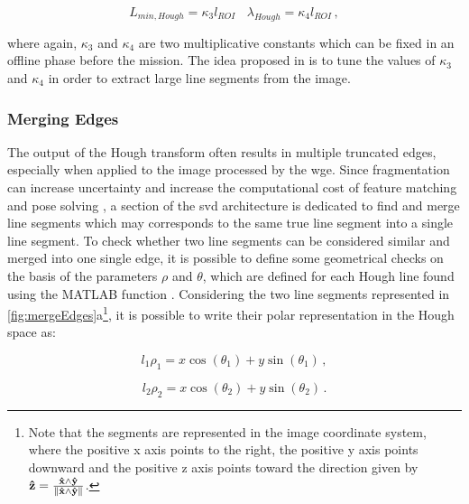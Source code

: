 \begin{equation*}
L_{min,Hough} = \kappa_3 l_{ROI} \ \ \ \  \lambda_{Hough} = \kappa_4 l_{ROI}  \,,
\end{equation*}

where again, $\kappa_3$ and $\kappa_4$  are two multiplicative constants which can be fixed in an offline phase before the mission. The idea proposed in \cite{Sharma2018} is to tune the values of $\kappa_3$ and $\kappa_4$ in order to extract large line segments from the image.

\subsubsection{Merging Edges}\label{sec:mergingedges}
The output of the Hough transform often results in multiple truncated edges, especially when applied to the image processed by the \acrshort{wge}. Since fragmentation can increase uncertainty and increase the computational cost of feature matching and pose solving \cite{fracchio2019}, a section of the \acrshort{svd} architecture is dedicated to find and merge line segments which may corresponds to the same true line segment into a single line segment.
To check whether two line segments can be considered similar and merged into one single edge, it is possible to define some geometrical checks on the basis of the parameters $\rho$ and $\theta$, which are defined for each Hough line found using the MATLAB function .
Considering the two line segments represented in \ref{fig:mergeEdges}a\footnote{Note that the segments are represented in the image coordinate system, where the positive x axis points to the right, the positive y axis points downward and the positive z axis points toward the direction given by $  \mathbf{\hat{z}} = \frac{\mathbf{\hat{x}} \wedge \mathbf{\hat{y}}}{\left\lVert\mathbf{\hat{x}} \wedge \mathbf{\hat{y}}\right\rVert}$.}, it is possible to write their polar representation in the Hough space as:

\begin{equation}
l_1 \rho_1 = x \cos (\theta_1) +  y \sin (\theta_1) \,,
\end{equation}

\begin{equation}
l_2 \rho_2 = x \cos (\theta_2) +  y \sin (\theta_2) \,.
\end{equation}

